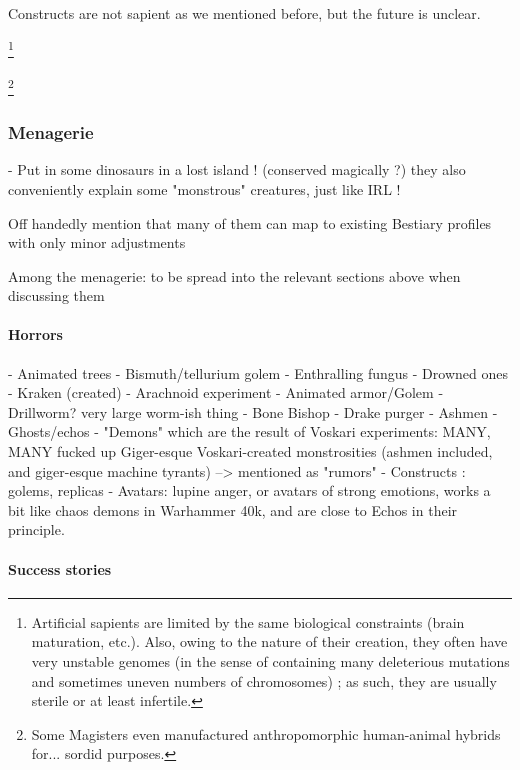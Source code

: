Constructs are not sapient as we mentioned before, but the future is unclear.


\footnote{Artificial sapients are limited by the same biological constraints (brain maturation, etc.). Also, owing to the nature of their creation, they often have very unstable genomes (in the sense of containing many deleterious mutations and sometimes uneven numbers of chromosomes) ; as such, they are usually sterile or at least infertile.}



\footnote{Some Magisters even manufactured anthropomorphic human-animal hybrids for... sordid purposes.}


















\subsubsection{Menagerie}


- Put in some dinosaurs in a lost island ! (conserved magically ?) they also conveniently explain some "monstrous" creatures, just like IRL !

Off handedly mention that many of them can map to existing Bestiary profiles with only minor adjustments


Among the menagerie: to be spread into the relevant sections above when discussing them


\paragraph{Horrors}

- Animated trees
- Bismuth/tellurium golem
- Enthralling fungus
- Drowned ones
- Kraken (created)
- Arachnoid experiment
- Animated armor/Golem
- Drillworm? very large worm-ish thing
- Bone Bishop
- Drake purger
- Ashmen
 - Ghosts/echos
- "Demons" which are the result of Voskari experiments:	MANY, MANY fucked up Giger-esque Voskari-created monstrosities (ashmen included, and giger-esque machine tyrants) –> mentioned as "rumors"
- Constructs : golems, replicas
- Avatars: lupine anger, or avatars of strong emotions, works a bit like chaos demons in Warhammer 40k, and are close to Echos in their principle.

\paragraph{Success stories}



